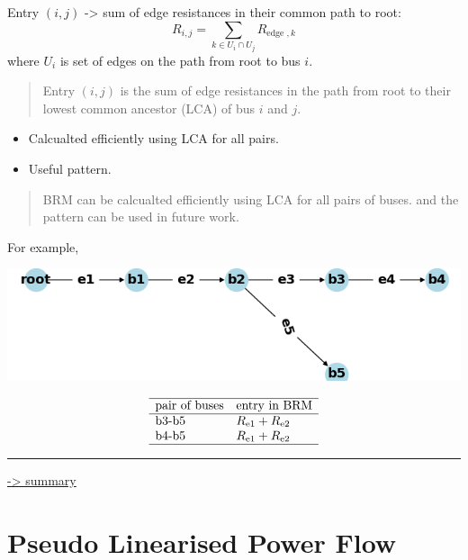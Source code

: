 \documentclass[
]{book}
\providecommand{\tightlist}{%
  \setlength{\itemsep}{0pt}\setlength{\parskip}{0pt}}
\begin{document}
Entry \((i, j)\) -\textgreater{} sum of edge resistances in their common path to root:
\[
R_{i, j}=\sum_{k \in U_{i} \cap U_{j}} R_{\text {edge }, k}
\]
where \(U_{i}\) is set of edges on the path from root to bus \(i\).

\begin{quote}
Entry \((i, j)\) is the sum of edge resistances in the path from root to their
lowest common ancestor (LCA) of bus \(i\) and \(j\).
\end{quote}

\begin{itemize}
\tightlist
\item
  Calcualted efficiently using LCA for all pairs.
\item
  Useful pattern.
\end{itemize}

\begin{quote}
BRM can be calcualted efficiently using LCA for all pairs of buses. and the
pattern can be used in future work.
\end{quote}

For example,

\begin{center}\includegraphics[width=0.7\linewidth]{Pictures/figCaseSix} \end{center}

\[ \begin{array}{ll}
  \hline
  \text{pair of buses} & \text{entry in BRM} \\
  \hline
  \text{b3-b5} & R_\text{e1} + R_\text{e2} \\
  \text{b4-b5} & R_\text{e1} + R_\text{e2} \\
  \hline
\end{array} \]

\begin{center}\rule{0.5\linewidth}{0.5pt}\end{center}

\protect\hyperlink{summary}{-\textgreater{} summary}

\hypertarget{brmInv}{%
\section{Pseudo Linearised Power Flow}\label{brmInv}}
\end{document}
